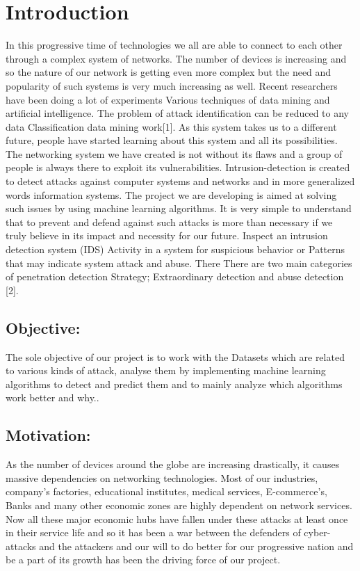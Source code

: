 \documentclass[conference]{IEEEtran}
\begin{document}
\section{Introduction}
In this progressive time of technologies we all are able to connect to each other through a complex system of networks. The number of devices is increasing and so the nature of our network is getting even more complex but the need and popularity of such systems is very much increasing as well. Recent researchers have been doing a lot of experiments Various techniques of data mining and artificial intelligence. The problem of attack identification can be reduced to any data Classification data mining work[1]. As this system takes us to a different future, people have started learning about this system and all its possibilities. The networking system we have created is not without its flaws and a group of people is always there to exploit its vulnerabilities. Intrusion-detection is created to detect attacks against computer systems and networks and in more generalized words information systems. The project we are developing is aimed at solving such issues by using machine learning algorithms. It is very simple to understand that to prevent and defend against such attacks is more than necessary if we truly believe in its impact and necessity for our future. Inspect an intrusion detection system (IDS) Activity in a system for suspicious behavior or Patterns that may indicate system attack and abuse. There There are two main categories of penetration detection Strategy; Extraordinary detection  and abuse detection [2].

\subsection{Objective: }

  The sole objective of our project is to work with the Datasets which are related to various kinds of attack, analyse them by implementing machine learning algorithms to detect and predict them and to mainly analyze which algorithms work better and why..     



\subsection{Motivation:}


As the number of devices around the globe are increasing drastically, it causes massive dependencies on networking technologies. Most of our industries, company’s factories, educational institutes, medical services, E-commerce’s, Banks and many other economic zones are highly dependent on network services. Now all these major economic hubs have fallen under these attacks at least once in their service life and so it has been a war between the defenders of cyber-attacks and the attackers and our will to do better for our progressive nation and be a part of its growth has been the driving force of our project.
\end{document}
